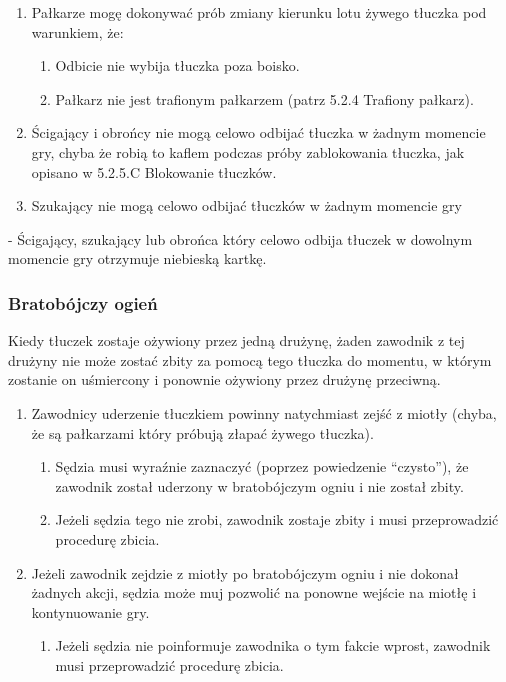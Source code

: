 \documentclass[12pt]{article}
\newcommand\bluecard{\bgroup\color{blue}\markoverwith{\textcolor{blue}{\rule[-0.5ex]{2pt}{0.4pt}}}\ULon}
\begin{document}
\begin{enumerate}
	\item
	      Pałkarze mogę dokonywać prób zmiany kierunku lotu żywego tłuczka pod
	      warunkiem, że:

	      \begin{enumerate}
		      \item
		            Odbicie nie wybija tłuczka poza boisko.
		      \item
		            Pałkarz nie jest trafionym pałkarzem (patrz 5.2.4 Trafiony pałkarz).
	      \end{enumerate}
	\item
	      Ścigający i obrońcy nie mogą celowo odbijać tłuczka w żadnym momencie
	      gry, chyba że robią to kaflem podczas próby zablokowania tłuczka, jak
	      opisano w 5.2.5.C Blokowanie tłuczków.
	\item
	      Szukający nie mogą celowo odbijać tłuczków w żadnym momencie gry
\end{enumerate}

\bluecard{Niebieska kartka} - Ścigający, szukający lub obrońca który celowo
odbija tłuczek w dowolnym momencie gry otrzymuje niebieską kartkę.

\subsubsection{Bratobójczy ogień}

Kiedy tłuczek zostaje ożywiony przez jedną drużynę, żaden zawodnik z tej
drużyny nie może zostać zbity za pomocą tego tłuczka do momentu, w
którym zostanie on uśmiercony i ponownie ożywiony przez drużynę
przeciwną.

\begin{enumerate}
	\item
	      Zawodnicy uderzenie tłuczkiem powinny natychmiast zejść z miotły
	      (chyba, że są pałkarzami który próbują złapać żywego tłuczka).

	      \begin{enumerate}
		      \item
		            Sędzia musi wyraźnie zaznaczyć (poprzez powiedzenie ``czysto''), że
		            zawodnik został uderzony w bratobójczym ogniu i nie został zbity.
		      \item
		            Jeżeli sędzia tego nie zrobi, zawodnik zostaje zbity i musi
		            przeprowadzić procedurę zbicia.
	      \end{enumerate}
	\item
	      Jeżeli zawodnik zejdzie z miotły po bratobójczym ogniu i nie dokonał
	      żadnych akcji, sędzia może muj pozwolić na ponowne wejście na miotłę i
	      kontynuowanie gry.

	      \begin{enumerate}
		      \item
		            Jeżeli sędzia nie poinformuje zawodnika o tym fakcie wprost,
		            zawodnik musi przeprowadzić procedurę zbicia.
	      \end{enumerate}
\end{enumerate}
\end{document}
